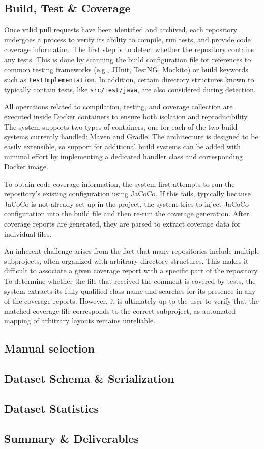 \subsection{Build, Test \& Coverage}

Once valid pull requests have been identified and archived, each repository undergoes a process to
verify its ability to compile, run tests, and provide code coverage information. The first step is
to detect whether the repository contains any tests. This is done by scanning the build
configuration file for references to common testing frameworks (e.g., JUnit, TestNG, Mockito) or
build keywords such as \texttt{testImplementation}. In addition, certain directory structures known
to typically contain tests, like \texttt{src/test/java}, are also considered during detection.

All operations related to compilation, testing, and coverage collection are executed inside Docker
containers to ensure both isolation and reproducibility. The system supports two types of
containers, one for each of the two build systems currently handled: Maven and Gradle. The
architecture is designed to be easily extensible, so support for additional build systems can be
added with minimal effort by implementing a dedicated handler class and corresponding Docker image.

To obtain code coverage information, the system first attempts to run the repository’s existing
configuration using JaCoCo. If this fails, typically because JaCoCo is not already set up in the
project, the system tries to inject JaCoCo configuration into the build file and then re-run the
coverage generation. After coverage reports are generated, they are parsed to extract coverage data
for individual files.

An inherent challenge arises from the fact that many repositories include multiple subprojects,
often organized with arbitrary directory structures. This makes it difficult to associate a given
coverage report with a specific part of the repository. To determine whether the file that received
the comment is covered by tests, the system extracts its fully qualified class name and searches for
its presence in any of the coverage reports. However, it is ultimately up to the user to verify that
the matched coverage file corresponds to the correct subproject, as automated mapping of arbitrary
layouts remains unreliable.

\subsection{Manual selection}
\label{sec:manual-selection}
\subsection{Dataset Schema \& Serialization}
\subsection{Dataset Statistics}
\subsection{Summary \& Deliverables}
